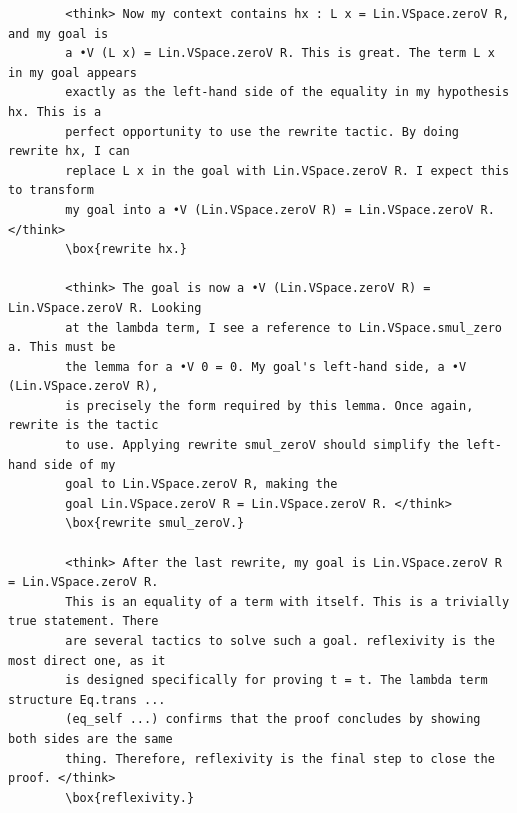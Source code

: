 \documentclass{article}
\theoremstyle{plain}
\theoremstyle{definition}
\theoremstyle{remark}
\begin{document}
\begin{verbatim}
		<think> Now my context contains hx : L x = Lin.VSpace.zeroV R, and my goal is
		a •V (L x) = Lin.VSpace.zeroV R. This is great. The term L x in my goal appears
		exactly as the left-hand side of the equality in my hypothesis hx. This is a
		perfect opportunity to use the rewrite tactic. By doing rewrite hx, I can
		replace L x in the goal with Lin.VSpace.zeroV R. I expect this to transform
		my goal into a •V (Lin.VSpace.zeroV R) = Lin.VSpace.zeroV R. </think>
		\box{rewrite hx.}
		
		<think> The goal is now a •V (Lin.VSpace.zeroV R) = Lin.VSpace.zeroV R. Looking
		at the lambda term, I see a reference to Lin.VSpace.smul_zero a. This must be
		the lemma for a •V 0 = 0. My goal's left-hand side, a •V (Lin.VSpace.zeroV R),
		is precisely the form required by this lemma. Once again, rewrite is the tactic
		to use. Applying rewrite smul_zeroV should simplify the left-hand side of my
		goal to Lin.VSpace.zeroV R, making the
		goal Lin.VSpace.zeroV R = Lin.VSpace.zeroV R. </think>
		\box{rewrite smul_zeroV.}
		
		<think> After the last rewrite, my goal is Lin.VSpace.zeroV R = Lin.VSpace.zeroV R.
		This is an equality of a term with itself. This is a trivially true statement. There
		are several tactics to solve such a goal. reflexivity is the most direct one, as it
		is designed specifically for proving t = t. The lambda term structure Eq.trans ...
		(eq_self ...) confirms that the proof concludes by showing both sides are the same
		thing. Therefore, reflexivity is the final step to close the proof. </think>
		\box{reflexivity.}
	\end{verbatim}
	
	
\end{document}
